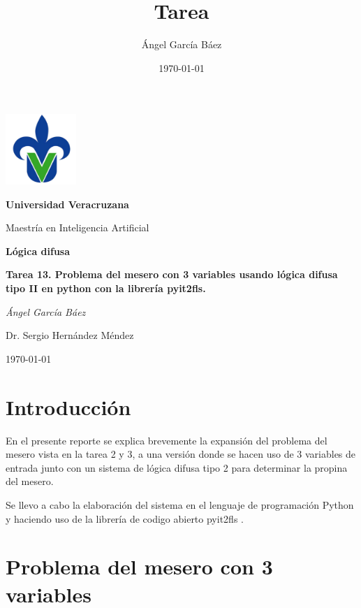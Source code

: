 \documentclass[11pt, letterpaper]{article}
\title{\bfseries Tarea}
\author{Ángel García Báez}
\date{\today}
\begin{document}
	\begin{titlepage}
		\centering
		\includegraphics[width=0.2\textwidth]{logo.png}\par
		\vspace{1cm}
		{\LARGE \bfseries Universidad Veracruzana \par}
		\vspace{1cm}
		{\Large Maestría en Inteligencia Artificial\par}
		\vspace{3cm}
		{\LARGE \bfseries Lógica difusa \par}
		\vspace{1cm}
		{\Large \bfseries Tarea 13. Problema del mesero con 3 variables usando lógica difusa tipo II en python con la librería pyit2fls. \par}
		\vfill
		{\Large \textit{Ángel García Báez}\par}
		\vfill
		{\Large Dr. Sergio Hernández Méndez \par}
		\vfill
		{\Large \today \par}
	\end{titlepage}
	
	\newpage
	\tableofcontents
	\newpage
	

\section{Introducción}

En el presente reporte se explica brevemente la expansión del problema del mesero vista en la tarea 2 y 3, a una versión donde se hacen uso de 3 variables de entrada junto con un sistema de lógica difusa tipo 2 para determinar la propina del mesero.

Se llevo a cabo la elaboración del sistema en el lenguaje de programación Python y haciendo uso de la librería de codigo abierto pyit2fls \cite{haghrah2025pyit2fls}.


\newpage


\section{Problema del mesero con 3 variables}
\end{document}
